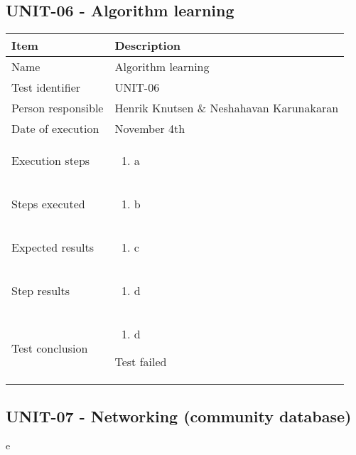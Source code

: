 \documentclass[a4paper]{article}
\begin{document}
\subsection{UNIT-06 - Algorithm learning}
	\begin{center}
		\begin{tabular}{ |  p{3cm} | p{7cm} | }
			\hline
			Item & Description \\ [5pt] \hline \hline
			Name & Algorithm learning \\  [5pt] \hline
			Test identifier & UNIT-06 \\  [5pt] \hline
			Person responsible & Henrik Knutsen \& Neshahavan Karunakaran \\  [5pt] \hline
			Date of execution & November 4th \\  [5pt] \hline

			Execution steps & 	\begin{enumerate}
							\item a
						\end{enumerate} \\ [5pt] \hline

			Steps executed & 	\begin{enumerate}
							\item b
						\end{enumerate} \\ [5pt] \hline
			
			Expected results &	\begin{enumerate}
							\item c
						\end{enumerate}
							 \\  [5pt] \hline

			Step results & 	\begin{enumerate}
							\item d
						\end{enumerate}
							 \\  [5pt] \hline

			Test conclusion & 	\begin{enumerate}
							\item d
						\end{enumerate}
						Test failed \\ [5pt] \hline
		\end{tabular}
	\end{center}

\subsection{UNIT-07 - Networking (community database)}
	e
\end{document}
